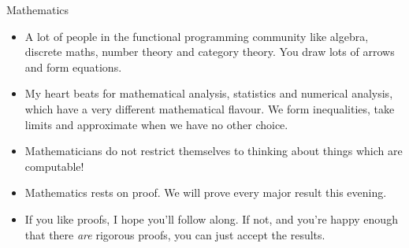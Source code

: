 \documentclass{beamer}
\begin{document}
\begin{frame}{Mathematics}
\begin{itemize}
\item A lot of people in the functional programming community like algebra, discrete maths, number theory and 
			category theory. You draw lots of arrows and form equations.
\item My heart beats for mathematical analysis, statistics and numerical analysis, which have a very 
			different mathematical flavour. We form inequalities, take limits and approximate when we have no other choice.
\item Mathematicians do not restrict themselves to thinking about things which are computable!
\item Mathematics rests on proof. We will prove every major result this evening. 
\item If you like proofs, I hope you'll follow along. If not, and you're happy enough that there
			\emph{are} rigorous proofs, you can just accept the results.
\end{itemize}
\end{frame}





\end{document}
